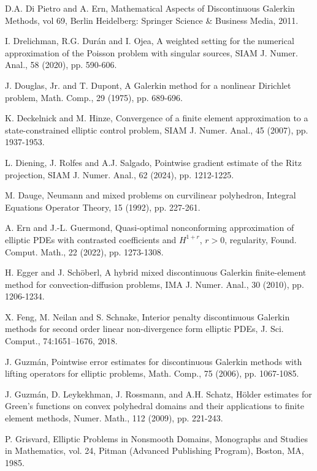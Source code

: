 \documentclass[1996/10/24]{amsart}
\theoremstyle{definition}
\numberwithin{equation}{section}
\begin{document}
\begin{thebibliography}{}
D.A. Di Pietro and A. Ern, Mathematical Aspects of Discontinuous Galerkin Methods, vol 69, Berlin Heidelberg: Springer Science \& Business Media, 2011.

I. Drelichman, R.G. Dur\'{a}n and I. Ojea, A weighted setting for the numerical approximation of the Poisson problem with singular sources, SIAM J. Numer.
Anal., 58 (2020), pp. 590-606.

J. Douglas, Jr. and T. Dupont, A Galerkin method for a nonlinear Dirichlet problem, Math. Comp., 29 (1975), pp. 689-696.

K. Deckelnick and M. Hinze, Convergence of a finite element approximation to a state-constrained elliptic control problem, SIAM J. Numer. Anal., 45 (2007),
pp. 1937-1953.

L. Diening, J. Rolfes and A.J. Salgado, Pointwise gradient estimate of the Ritz projection, SIAM J. Numer. Anal., 62 (2024), pp. 1212-1225.

M. Dauge, Neumann and mixed problems on curvilinear polyhedron, Integral Equations Operator Theory, 15 (1992), pp. 227-261.

A. Ern and J.-L. Guermond, Quasi-optimal nonconforming approximation of elliptic PDEs with contrasted coefficients and $H^{1+r}$, $r>0$, regularity,
Found. Comput. Math., 22 (2022), pp. 1273-1308.

H. Egger and J. Sch\"{o}berl, A hybrid mixed discontinuous Galerkin finite-element method for convection-diffusion problems, IMA J. Numer. Anal., 30 (2010), pp. 1206-1234.

X. Feng, M. Neilan and S. Schnake, Interior penalty discontinuous Galerkin methods for second order linear non-divergence form elliptic PDEs,
J. Sci. Comput., 74:1651--1676, 2018.

J. Guzm\'{a}n, Pointwise error estimates for discontinuous Galerkin methods with lifting operators for elliptic problems, Math. Comp., 75 (2006), pp. 1067-1085.

J. Guzm\'{a}n, D. Leykekhman, J. Rossmann, and A.H. Schatz, H\"{o}lder estimates for Green's functions on convex polyhedral domains and their applications to finite element methods, Numer. Math., 112 (2009), pp. 221-243.

P. Grisvard, Elliptic Problems in Nonsmooth Domains, Monographs and Studies in Mathematics, vol. 24, Pitman (Advanced Publishing Program), Boston,
MA, 1985.


\end{thebibliography}
\end{document}
